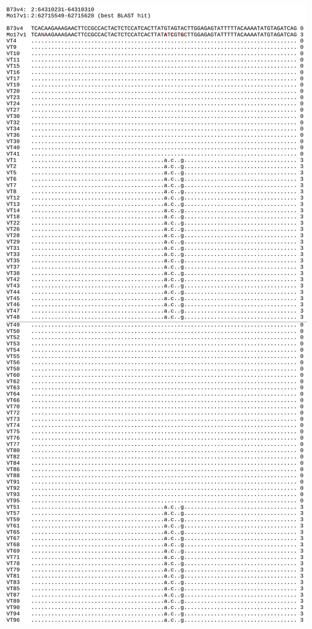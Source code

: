\documentclass[maize,portrait]{a0poster}
\newlength{\figwidth}
\begin{document}
\begin{multicols}{3}
  \begin{minipage}[t]{0.48\linewidth}
    \includegraphics[width=0.48\figwidth]{2.64310231-64310310.png}
\end{minipage}
\end{multicols}
\end{document}
